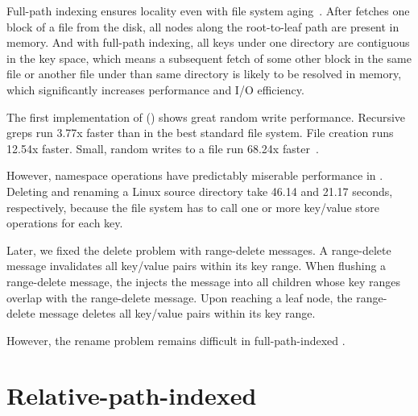 Full-path indexing ensures locality even with file system aging~\citep{betrfs3}.
After \betrfs fetches one block of a file from the disk, all nodes along the
root-to-leaf path are present in memory.
And with full-path indexing, all keys under one directory are contiguous in the
key space, which means a subsequent fetch of some other block in the same file or
another file under than same directory is likely to be resolved in memory,
which significantly increases performance and I/O efficiency.

The first implementation of \betrfs (\betrfsOne) shows great random write
performance.
Recursive greps run 3.77x faster than in the best standard file system.
File creation runs 12.54x faster.
Small, random writes to a file run 68.24x faster~\citep{betrfs1tos}.

However, namespace operations have predictably miserable performance in
\betrfsOne.
Deleting and renaming a Linux source directory take 46.14 and 21.17 seconds,
respectively, because the file system has to call one or more key/value store
operations for each key.

Later, we fixed the delete problem with range-delete messages.
A range-delete message invalidates all key/value pairs within its key range.
When flushing a range-delete message, the \bet injects the message into all
children whose key ranges overlap with the range-delete message.
Upon reaching a leaf node, the range-delete message deletes all key/value pairs
within its key range.

However, the rename problem remains difficult in full-path-indexed \betrfs.

\section{Relative-path-indexed \betrfs}
\label{sec:rpi}

